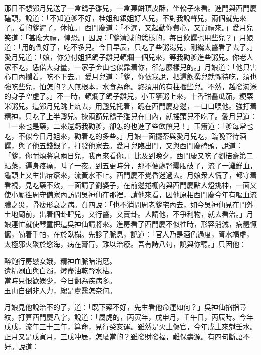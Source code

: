 那日不想鄭月兒送了一盒鴿子雛兒，一盒菓餅頂皮酥，坐轎子來看。進門與西門慶磕頭，說道：「不知道爹不好，桂姐和銀姐好人兒，不對我說聲兒，兩個就先來了。看的爹遲了，休恠。」西門慶道：「不遲，又起動你費心，又買禮來。」愛月兒笑道：「甚麼大禮，惶恐。」因說：「爹清減的恁樣的，每日飲饌也用些兒？」月娘道：「用的倒好了，吃不多兒。今日早辰，只吃了些粥湯兒，剛纔太醫看了去了。」愛月兒道：「娘，你分付姐把鴿子雛兒頓爛一個兒來，等我勸爹進些粥兒。你老人家不吃，恁偌大身量，一家子金山也似靠着你，卻怎麼樣兒的。」月娘道：「他只害心口內攔着，吃不下去。」愛月兒道：「爹，你依我說，把這飲撰兒就懶待吃，須也強吃些兒，怕怎的？人無根本，水食為命。終須用的有柱攕些兒。不然，越發淘淥的身子空虛了。」不一時，頓爛了鴿子雛兒，小玉拏粥上來，十香甜醬瓜茄，粳粟米粥兒。這鄭月兒跳上炕去，用盞兒托着，跪在西門慶身邊，一口口喂他。強打着精神，只吃了上半盞兒。揀兩筯兒鴿子雛兒在口內，就搖頭兒不吃了。愛月兒道：「一來也是藥，{}二來還虧我勸爹，卻怎的也進了些飲饌兒！」玉簫道：「爹每常也吃，不似今日月姐來，勸着吃的多些。」月娘一面擺茶與愛月兒吃，臨晚管待酒饌，與了他五錢銀子，打發他家去。愛月兒臨出門，又與西門慶磕頭，說道：「爹，你耐煩將息兩日兒，我再來看你。」比及到晚夕，西門慶又吃了劉桔齋第二貼藥，遍身疼痛，叫了一夜。到五更時分，那不便處腎囊脹破了，流了一灘鮮血，龜頭上又生出疳瘡來，流黃水不止。{}西門慶不覺昏迷過去。月娘衆人慌了，都守着看視，見吃藥不效，一面請了劉婆子，在前邊捲棚內與西門慶點人燈挑神，一面又使小厮徃周守備家內訪問吳神仙在那裡，請他來看，因他原相西門慶今年有嘔血流膿之災，骨瘦形衰之病。賁四說：「也不消問周老爹宅內去，如今吳神仙見在門外土地廟前，出着個卦肆兒，又行醫，又賣卦。人請他，不爭利物，就去看治。」月娘連忙就使琴童把這吳神仙請將來。進房看了西門慶不似徃時，形容消減，病體懨懨，勒着手帕，在於臥榻。先診了脈息，說道：「官人乃是酒色過度，腎水竭虛，太極邪火聚於慾海，病在膏肓，難以治療。吾有詩八句，說與你聽。」只因他：

\begin{myquote} 
醉飽行房戀女娥，精神血脈暗消磨。\\遺精溺血與白濁，燈盡油乾腎水枯。\\當時只恨歡娛少，今日翻為疾病多。\\玉山自倒非人力，總是盧醫怎奈何。
\end{myquote} 

月娘見他說治不的了，道：「既下藥不好，先生看他命運如何？」吳神仙掐指尋紋，打算西門慶八字，說道：「屬虎的，丙寅年，戊申月，壬午日，丙辰時。今年戊戌，流年三十三年，算命，見行癸亥運。雖然是火土傷官，今年戊土來尅壬水。正月又是戊寅月，三戊冲辰，怎麼當的？雖發財發福，難保壽源。有四句斷語不好。說道：

